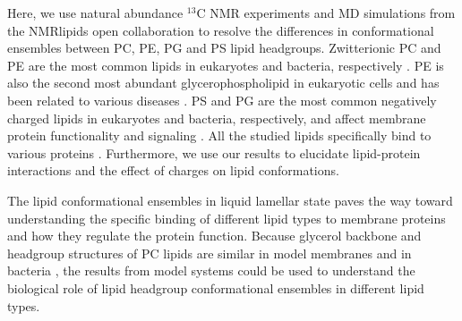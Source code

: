 \documentclass[aps,prl,superscriptaddress,twocolumn]{revtex4}
\begin{document}
Here, we use natural abundance $^{13}$C NMR experiments and MD simulations from the NMRlipids open collaboration
to resolve the differences in conformational ensembles between PC, PE, PG and PS lipid headgroups.
Zwitterionic PC and PE are the most common lipids in eukaryotes and bacteria, respectively \cite{vanmeer08,sohlenkamp16}.
PE is also the second most abundant glycerophospholipid in eukaryotic cells
and has been related to various diseases \cite{vance15,calzada16,patel17}.
PS and PG are the most common negatively charged lipids in eukaryotes and bacteria, respectively,
and affect membrane protein functionality and signaling \cite{lemmon08,leventis10,sohlenkamp16,hariharan18}.
All the studied lipids specifically bind to various proteins \cite{yeagle14}.
Furthermore, we use our results to elucidate lipid-protein interactions and the effect of charges on lipid conformations.

The lipid conformational ensembles in liquid lamellar state paves the way toward understanding the
specific binding of different lipid types to membrane proteins and how they regulate the protein function.
Because glycerol backbone and headgroup structures of PC lipids are similar in model membranes and in bacteria \cite{gally81,scherer87,seelig90},
the results from model systems could be used to understand the biological role of lipid headgroup conformational ensembles in different lipid types.

\end{document}
